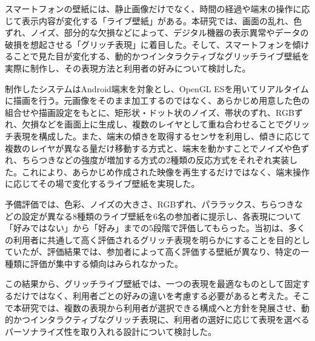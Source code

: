 スマートフォンの壁紙には、静止画像だけでなく、時間の経過や端末の操作に応じて表示内容が変化する「ライブ壁紙」がある。本研究では、画面の乱れ、色ずれ、ノイズ、部分的な欠損などによって、デジタル機器の表示異常やデータの破損を想起させる「グリッチ表現」に着目した。そして、スマートフォンを傾けることで見た目が変化する、動的かつインタラクティブなグリッチライブ壁紙を実際に制作し、その表現方法と利用者の好みについて検討した。

制作したシステムはAndroid端末を対象とし、OpenGL ESを用いてリアルタイムに描画を行う。元画像をそのまま加工するのではなく、あらかじめ用意した色の組合せや描画設定をもとに、矩形状・ドット状のノイズ、帯状のずれ、RGBずれ、欠損などを画面上に生成し、複数のレイヤとして重ね合わせることでグリッチ表現を構成した。また、端末の傾きを取得するセンサを利用し、傾きに応じて複数のレイヤが異なる量だけ移動する方式と、端末を動かすことでノイズや色ずれ、ちらつきなどの強度が増加する方式の2種類の反応方式をそれぞれ実装した。これにより、あらかじめ作成された映像を再生するだけではなく、端末操作に応じてその場で変化するライブ壁紙を実現した。

予備評価では、色彩、ノイズの大きさ、RGBずれ、パララックス、ちらつきなどの設定が異なる8種類のライブ壁紙を6名の参加者に提示し、各表現について「好みではない」から「好み」までの5段階で評価してもらった。当初は、多くの利用者に共通して高く評価されるグリッチ表現を明らかにすることを目的としていたが、評価結果では、参加者によって高く評価する壁紙が異なり、特定の一種類に評価が集中する傾向はみられなかった。

この結果から、グリッチライブ壁紙では、一つの表現を最適なものとして固定するだけではなく、利用者ごとの好みの違いを考慮する必要があると考えた。そこで本研究では、複数の表現から利用者が選択できる構成へと方針を発展させ、動的かつインタラクティブなグリッチ表現に、利用者の選好に応じて表現を選べるパーソナライズ性を取り入れる設計について検討した。
